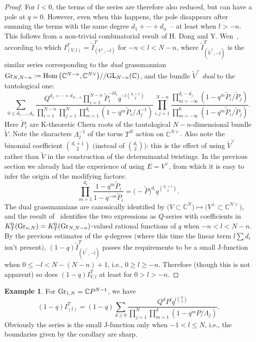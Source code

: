 \documentclass[10pt,a4paper]{amsart}
\numberwithin{equation}{section}
\def\CC{\mathbb C}
\def\tilde{\widetilde}
\theoremstyle{definition}
\newtheorem*{example*}{Example}
\theoremstyle{plain}
\begin{document}
\begin{proof}
For $l<0$, the terms of the series are therefore also reduced, but can have a pole at $q=0$. However, even when this happens, the pole disappears after summing the terms with the same degree $d_1+\cdots+d_n$~-- at least when $l>-n$. This follows from a non-trivial combinatorial result of H. Dong and Y. Wen~\cite{Dong-Wen}, according to which $I^T_{(V,l)}=\tilde{I}^T_{(V^{\vee},-l)}$ for \mbox{$-n<l<N-n$}, where $\tilde{I}^T_{(\tilde{V}^{\vee},-l)}$ is the similar series corresponding to the {\em dual} grassmannian ${\rm Gr}_{N,N-n}:=\mathop{\rm Hom} \big(\CC^{N-n},\CC^{N\vee}\big)//{\rm GL}_{N-n}(\CC)$, and the bundle $\tilde{V}^{\vee}$ {\em dual} to the tautological one:
\[
\sum_{0\leq d_1,\dots,d_n}\frac{Q^{d_1+\cdots+d_{N-n}}\prod_{i=1}^{N-n}\tilde{P}_i^{-ld_i}q^{-l\binom{d_i+1}{2}}}{\prod_{i=1}^{N-n}\prod_{j=1}^N\prod_{m=1}^{d_i}(1-q^m\tilde{P}_i/\Lambda_j^{-1})} \prod_{i,j=1}^{N-n}\frac{\prod_{m=-\infty}^{d_i-d_j}(1-q^m\tilde{P}_i/\tilde{P}_j)}{\prod_{m=-\infty}^0(1-q^m\tilde{P}_i/\tilde{P}_j)}.
\]
Here $\tilde{P}_i$ are K-theoretic Chern roots of the tautological $N-n$-dimensional bundle $\tilde{V}$. Note the characters $\Lambda_j^{-1}$ of the torus $T^N$ action on $\CC^{N\vee}$. Also note the binomial coefficient $\binom{d_i+1}{2}$ $\big($instead of $\binom{d_i}{2}\big)$: this is the effect of using $\tilde{V}^{\vee}$ rather than $\tilde{V}$ in the construction of the determinantal twistings. In the previous section we already had the experience of using $E=V^{\vee}$, from which it is easy to infer the origin of the modifying factors:
\[
\prod_{m=1}^{d_i}\frac{1-q^m\tilde{P}_i}{1-q^{-m}\tilde{P}_i} = \big({-}\tilde{P}\big)^{d_i}q^{\binom{d_i+1}{2}}.
\]
The dual grassmannians are canonically identified by $\big(V\subset \CC^N\big) \mapsto \big(V^{\perp}\subset \CC^{N\vee}\big)$, and the result of~\cite{Dong-Wen} identifies the two expressions as $Q$-series with coefficients in $K^0_T({\rm Gr}_{n,N})=K^0_T({\rm Gr}_{N,N-n})$-valued rational functions of $q$ when $-n<l<N-n$. By the previous estimates of the $q$-degrees $\big($where this time the linear term $l\sum d_i$ isn't present$\big)$, $(1-q)\tilde{I}^T_{(\tilde{V}^{\vee},-l)}$ passes the requirements to be a small J-function when $0\leq -l < N-(N-n)+1$, i.e., $0\geq l\geq -n$. Therefore (though this is not apparent) so does $(1-q)I^T_{V,l}$ at least for $0>l>-n$.
\end{proof}

\begin{example*}\label{ex1}For ${\rm Gr}_{1,N}=\CC P^{N-1}$, we have
\[
(1-q) I^T_{(l)}=(1-q) \sum_{d\geq 0}\frac{Q^d P^l q^{l\binom{d}{2}}}{\prod_{j=1}^N\prod_{m=1}^d(1-q^mP/\Lambda_j)}.
\]
Obviously the series is the small J-function only when $-1< l \leq N$, i.e., the boundaries given by the corollary are sharp.
\end{example*}
\end{document}
